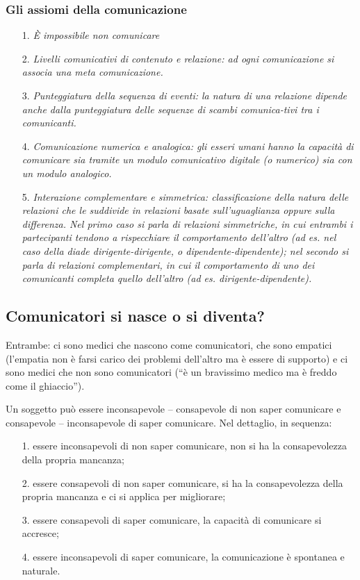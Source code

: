 \subsubsection{Gli assiomi della comunicazione}

\begin{itemize}
\item[1.]
  \emph{È impossibile non comunicare}
\item[2.]
  \emph{Livelli comunicativi di contenuto e relazione: ad ogni
  comunicazione si associa una meta comunicazione.}
\item[3.]
  \emph{Punteggiatura della sequenza di eventi: la natura di una
  relazione dipende anche dalla punteggiatura delle sequenze di scambi
  comunica-tivi tra i comunicanti.}
\item[4.]
  \emph{Comunicazione numerica e analogica: gli esseri umani hanno la
  capacità di comunicare sia tramite un modulo comunicativo digitale (o
  numerico) sia con un modulo analogico.}
\item[5.]
  \emph{Interazione complementare e simmetrica: classificazione della
  natura delle relazioni che le suddivide in relazioni basate
  sull'uguaglianza oppure sulla differenza. Nel primo caso si parla di
  relazioni simmetriche, in cui entrambi i partecipanti tendono a
  rispecchiare il comportamento dell'altro (ad es. nel caso della diade
  dirigente-dirigente, o dipendente-dipendente); nel secondo si parla di
  relazioni complementari, in cui il comportamento di uno dei
  comunicanti completa quello dell'altro (ad es. dirigente-dipendente).}
\end{itemize}

\subsection{Comunicatori si nasce o si diventa?}

Entrambe: ci sono medici che nascono come comunicatori, che sono
empatici (l'empatia non è farsi carico dei problemi dell'altro ma è
essere di supporto) e ci sono medici che non sono comunicatori (``è un
bravissimo medico ma è freddo come il ghiaccio'').

Un soggetto può essere inconsapevole -- consapevole di non saper
comunicare e consapevole -- inconsapevole di saper comunicare. Nel
dettaglio, in sequenza:

\begin{itemize}
\item[1.]
  essere inconsapevoli di non saper comunicare, non si ha la
  consapevolezza della propria mancanza;
\item[2.]
  essere consapevoli di non saper comunicare, si ha la consapevolezza
  della propria mancanza e ci si applica per migliorare;
\item[3.]
  essere consapevoli di saper comunicare, la capacità di comunicare si
  accresce;
\item[4.]
  essere inconsapevoli di saper comunicare, la comunicazione è spontanea
  e naturale.
\end{itemize}

